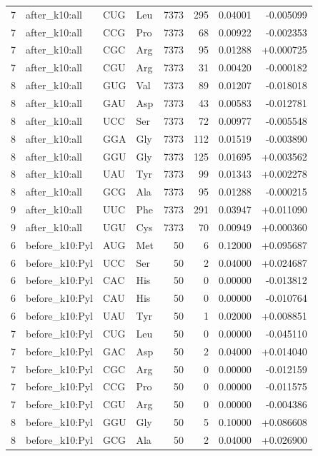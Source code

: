 \begin{longtable}{r l l l r r r r}
7 & after\_k10:all & CUG & Leu & 7373 & 295 & 0.04001 & -0.005099 \\
7 & after\_k10:all & CCG & Pro & 7373 & 68 & 0.00922 & -0.002353 \\
7 & after\_k10:all & CGC & Arg & 7373 & 95 & 0.01288 & +0.000725 \\
7 & after\_k10:all & CGU & Arg & 7373 & 31 & 0.00420 & -0.000182 \\
8 & after\_k10:all & GUG & Val & 7373 & 89 & 0.01207 & -0.018018 \\
8 & after\_k10:all & GAU & Asp & 7373 & 43 & 0.00583 & -0.012781 \\
8 & after\_k10:all & UCC & Ser & 7373 & 72 & 0.00977 & -0.005548 \\
8 & after\_k10:all & GGA & Gly & 7373 & 112 & 0.01519 & -0.003890 \\
8 & after\_k10:all & GGU & Gly & 7373 & 125 & 0.01695 & +0.003562 \\
8 & after\_k10:all & UAU & Tyr & 7373 & 99 & 0.01343 & +0.002278 \\
8 & after\_k10:all & GCG & Ala & 7373 & 95 & 0.01288 & -0.000215 \\
9 & after\_k10:all & UUC & Phe & 7373 & 291 & 0.03947 & +0.011090 \\
9 & after\_k10:all & UGU & Cys & 7373 & 70 & 0.00949 & +0.000360 \\
6 & before\_k10:Pyl & AUG & Met & 50 & 6 & 0.12000 & +0.095687 \\
6 & before\_k10:Pyl & UCC & Ser & 50 & 2 & 0.04000 & +0.024687 \\
6 & before\_k10:Pyl & CAC & His & 50 & 0 & 0.00000 & -0.013812 \\
6 & before\_k10:Pyl & CAU & His & 50 & 0 & 0.00000 & -0.010764 \\
6 & before\_k10:Pyl & UAU & Tyr & 50 & 1 & 0.02000 & +0.008851 \\
7 & before\_k10:Pyl & CUG & Leu & 50 & 0 & 0.00000 & -0.045110 \\
7 & before\_k10:Pyl & GAC & Asp & 50 & 2 & 0.04000 & +0.014040 \\
7 & before\_k10:Pyl & CGC & Arg & 50 & 0 & 0.00000 & -0.012159 \\
7 & before\_k10:Pyl & CCG & Pro & 50 & 0 & 0.00000 & -0.011575 \\
7 & before\_k10:Pyl & CGU & Arg & 50 & 0 & 0.00000 & -0.004386 \\
8 & before\_k10:Pyl & GGU & Gly & 50 & 5 & 0.10000 & +0.086608 \\
8 & before\_k10:Pyl & GCG & Ala & 50 & 2 & 0.04000 & +0.026900 \\

\end{longtable}
